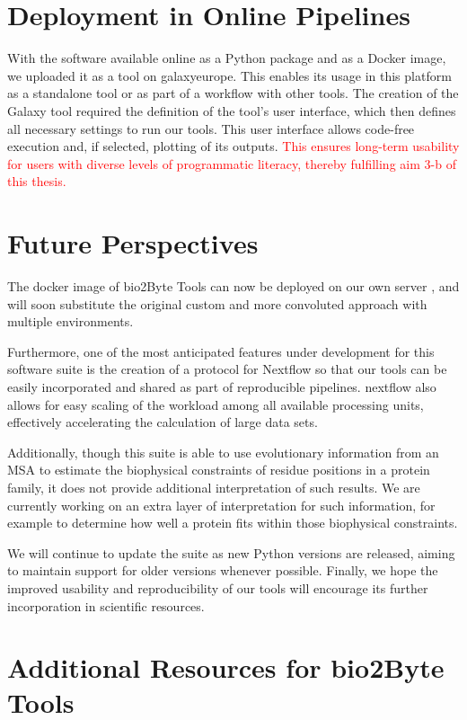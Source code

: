 \section{Deployment in Online Pipelines}
With the software available online as a Python package and as a Docker image, we uploaded it as a tool on \gls{galaxyeurope}. This enables its usage in this platform as a standalone tool or as part of a workflow with other tools. The creation of the Galaxy tool required the definition of the tool's user interface, which then defines all necessary settings to run our tools. This user interface allows code-free execution and, if selected, plotting of its outputs. \textcolor{red}{This ensures long-term usability for users with diverse levels of programmatic literacy, thereby fulfilling aim 3-b of this thesis.}

\section{Future Perspectives}

The docker image of bio2Byte Tools can now be deployed on our own server \cite{kagami_b2btools_2021}, and will soon substitute the original custom and more convoluted approach with multiple environments. 

Furthermore, one of the most anticipated features under development for this software suite is the creation of a protocol for Nextflow \cite{di_tommaso_nextflow_2017} so that our tools can be easily incorporated and shared as part of reproducible pipelines. \Gls{nextflow} also allows for easy scaling of the workload among all available processing units, effectively accelerating the calculation of large data sets. 

Additionally, though this suite is able to use evolutionary information from an MSA to estimate the biophysical constraints of residue positions in a protein family, it does not provide additional interpretation of such results. We are currently working on an extra layer of interpretation for such information, for example to determine how well a protein fits within those biophysical constraints. 

We will continue to update the suite as new Python versions are released, aiming to maintain support for older versions whenever possible. Finally, we hope the improved usability and reproducibility of our tools will encourage its further incorporation in scientific resources.


\section*{Additional Resources for bio2Byte Tools}

